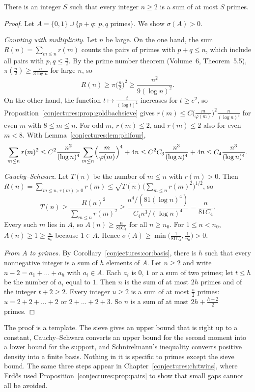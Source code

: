\begin{theorem}[Schnirelmann, 1930]\label{conjectures:thm:schnirelmann}
There is an integer $S$ such that every integer $n\ge2$ is a sum of at most $S$ primes.
\end{theorem}
\begin{proof}
Let $A=\{0,1\}\cup\{p+q:\ p,q\text{ primes}\}$. We show $\sigma(A)>0$.

\emph{Counting with multiplicity.} Let $n$ be large. On the one hand, the sum $R(n)=\sum_{m\le n}r(m)$ counts the pairs of primes with $p+q\le n$, which
include all pairs with $p,q\le\frac n2$. By the prime number theorem (Volume~6, Theorem~5.5), $\pi(\frac n2)\ge\frac n{3\log n}$ for large $n$, so
\[
R(n)\ge\pi\bigl(\tfrac n2\bigr)^2\ge\frac{n^2}{9(\log n)^2}.
\]
On the other hand, the function $t\mapsto\frac t{(\log t)^2}$ increases for $t\ge e^2$, so Proposition~\ref{conjectures:prop:goldbachsieve} gives
$r(m)\le C\bigl(\frac m{\varphi(m)}\bigr)^2\frac n{(\log n)^2}$ for even $m$ with $8\le m\le n$. For odd $m$, $r(m)\le2$, and $r(m)\le2$ also for even $m<8$.
With Lemma~\ref{conjectures:lem:phifour},
\[
\sum_{m\le n}r(m)^2\le C^2\frac{n^2}{(\log n)^4}\sum_{m\le n}\Bigl(\frac m{\varphi(m)}\Bigr)^4+4n\le C^2C_3\frac{n^3}{(\log n)^4}+4n\le C_4\frac{n^3}{(\log n)^4}.
\]

\emph{Cauchy--Schwarz.} Let $T(n)$ be the number of $m\le n$ with $r(m)>0$. Then $R(n)=\sum_{m\le n,\,r(m)>0}r(m)\le\sqrt{T(n)}\bigl(\sum_{m\le n}r(m)^2\bigr)^{1/2}$,
so
\[
T(n)\ge\frac{R(n)^2}{\sum_{m\le n}r(m)^2}\ge\frac{n^4/(81(\log n)^4)}{C_4n^3/(\log n)^4}=\frac n{81C_4}.
\]
Every such $m$ lies in $A$, so $A(n)\ge\frac n{81C_4}$ for all $n\ge n_0$. For $1\le n<n_0$, $A(n)\ge1\ge\frac n{n_0}$ because $1\in A$. Hence
$\sigma(A)\ge\min\bigl(\frac1{81C_4},\frac1{n_0}\bigr)>0$.

\emph{From $A$ to primes.} By Corollary~\ref{conjectures:cor:basis}, there is $h$ such that every nonnegative integer is a sum of $h$ elements of $A$. Let $n\ge2$ and write
$n-2=a_1+\dots+a_h$ with $a_i\in A$. Each $a_i$ is $0$, $1$ or a sum of two primes; let $t\le h$ be the number of $a_i$ equal to $1$. Then $n$ is the sum
of at most $2h$ primes and of the integer $t+2\ge2$. Every integer $u\ge2$ is a sum of at most $\frac u2$ primes: $u=2+2+\dots+2$ or $2+\dots+2+3$.
So $n$ is a sum of at most $2h+\frac{h+2}2$ primes.
\end{proof}

The proof is a template. The sieve gives an upper bound that is right up to a constant, Cauchy--Schwarz converts an upper bound for the second moment
into a lower bound for the support, and Schnirelmann's inequality converts positive density into a finite basis. Nothing in it is specific to primes
except the sieve bound. The same three steps appear in Chapter~\ref{conjectures:ch:twins}, where Erd\H{o}s used Proposition~\ref{conjectures:prop:pairs} to show that small
gaps cannot all be avoided.

